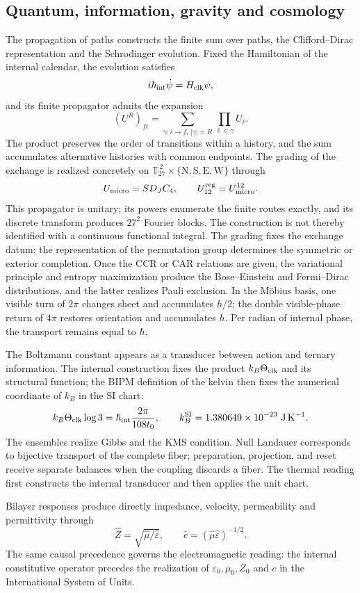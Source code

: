\subsection*{Quantum, information, gravity and cosmology}

The propagation of paths constructs the finite sum over paths, the
Clifford--Dirac representation and the Schrodinger evolution. Fixed the
Hamiltonian of the internal calendar, the evolution satisfies
\[
 i\hbar_{\rm int}\dot\psi=H_{\rm clk}\psi,
\]
and its finite propagator admits the expansion
\[
 (U^R)_{fi}=
 \sum_{\gamma:i\to f,\,|\gamma|=R}
 \prod_{\ell\in\gamma}U_\ell.
\]
The product preserves the order of transitions within a history, and
the sum accumulates alternative histories with common endpoints. The grading
of the exchange is realized concretely on
\(\mathbb T_{27}^{\,2}\times\{\mathrm N,\mathrm S,\mathrm E,\mathrm W\}\)
through
\[
 U_{\rm micro}=S D_J C_4,
 \qquad U_{12}^{\rm reg}=U_{\rm micro}^{12}.
\]
This propagator is unitary; its powers enumerate the finite routes exactly, and its discrete transform produces \(27^2\) Fourier blocks. The construction is not thereby identified with a continuous functional integral. The grading fixes the exchange datum; the representation of the permutation group determines the symmetric or exterior completion. Once the CCR or CAR relations are given, the variational principle and entropy maximization produce the Bose--Einstein and Fermi--Dirac distributions, and the latter realizes Pauli exclusion. In the Möbius basis, one visible turn of \(2\pi\) changes sheet and accumulates \(h/2\); the double visible-phase return of \(4\pi\) restores orientation and accumulates \(h\). Per radian of internal phase, the transport remains equal to \(\hbar\).

The Boltzmann constant appears as a transducer between action and ternary
information. The internal construction fixes the product
\(k_B\Theta_{\rm clk}\) and its structural function; the BIPM definition of the kelvin
then fixes the numerical coordinate of \(k_B\) in the SI chart:
\[
 k_B\Theta_{\rm clk}\log3=\hbar_{\rm int}\frac{2\pi}{108t_0},
 \qquad
 k_B^{\rm SI}=1.380649\times10^{-23}\ \mathrm{J\,K^{-1}}.
\]
The ensembles realize Gibbs and the KMS condition. Null Landauer corresponds
to bijective transport of the complete fiber; preparation, projection, and
reset receive separate balances when the coupling discards a
fiber. The thermal reading first constructs the internal transducer and then applies
the unit chart.

Bilayer responses produce directly impedance, velocity,
permeability and permittivity through
\[
 \widehat Z=\sqrt{\widehat\mu/\widehat\varepsilon},
 \qquad
 \widehat c=(\widehat\mu\widehat\varepsilon)^{-1/2}.
\]
The same causal precedence governs the electromagnetic reading: the internal
constitutive operator precedes the realization of
\(\varepsilon_0,\mu_0,Z_0\) and \(c\) in the International System of Units.

